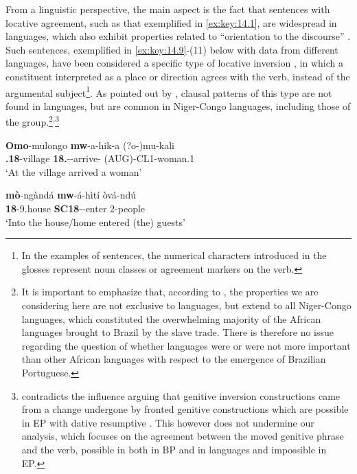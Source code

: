 \documentclass[output=paper]{langsci/langscibook}
\begin{document}
From a linguistic perspective, the main aspect is the fact that sentences with
locative agreement, such as that exemplified in \eqref{ex:key:14.1}, are widespread
in  languages, which also exhibit properties related to “orientation to
the discourse” \citep{Morimoto2006}. Such sentences, exemplified in
\eqref{ex:key:14.9}-(11) below with data from different  languages, have been
considered a specific type of locative inversion \citep{Salzmann2004}, in which
a constituent interpreted as a place or direction agrees with the verb, instead
of the argumental subject\footnote{In the examples of  sentences, the
numerical characters introduced in the glosses represent noun classes or
agreement markers on the verb.}. As pointed out by \citet{Baker2008}, clausal
patterns of this type are not found in  languages, but are common
in Niger-Congo languages, including those of the  group.\footnote{It is
    important to emphasize that, according to \citet{Baker2008}, the properties
    we are considering here are not exclusive to  languages, but extend to
    all Niger-Congo languages, which constituted the overwhelming majority of
    the African languages brought to Brazil by the slave trade. There is
    therefore no issue regarding the question of whether  languages were
    or were not more important than other African languages with respect to the
    emergence of Brazilian
    Portuguese.}\textsuperscript{,}\footnote{\textcite{Melo2014} contradicts
    the  influence arguing that genitive inversion constructions came from
    a change undergone by fronted genitive constructions which are possible in
    \gls{EP} with dative resumptive . This however does not undermine
    our analysis, which focuses on the agreement between the moved genitive
    phrase and the verb, possible in both in \gls{BP} and in  languages
and impossible in \gls{EP}.}

\ea\label{ex:key:14.9}  \parencite[119]{Baker2003}
    \sn
    \gll    \textbf{Omo}-mulongo \textbf{mw}-a-hik-a (?o-)mu-kali\\
            \textbf{\Loc.18}-village \textbf{18.\Sm}-\Tns-arrive-\Fv{} (AUG)-CL1-woman.1\\
    \glt    ‘At the village arrived a woman’\\
\z

\ea\label{ex:key:14.10}  \parencite[98]{Marten2006}
    \sn
    \gll    \textbf{mò}-ngàndá \textbf{mw}-á-hìtí òvá-ndú\\
            \textbf{18}-9.house \textbf{SC18}-\Pst-enter 2-people\\
    \glt    ‘Into the house/home entered (the) guests’
\z
\end{document}
